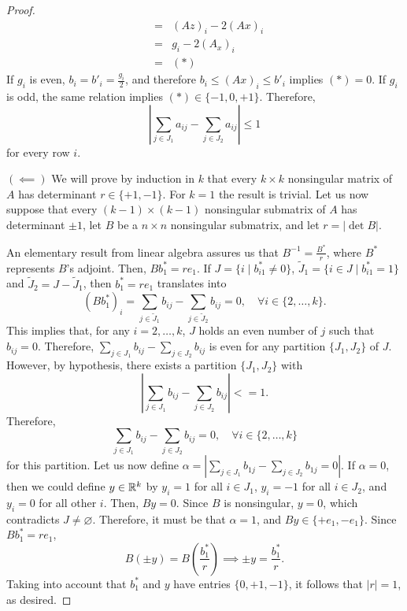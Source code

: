 \begin{proof}
\begin{eqnarray*}
            &=& (Az)_i - 2(Ax)_i\\
            &=& g_i - 2(A_x)_i\\
            &=& (*)
    \end{eqnarray*}
    If $g_i$ is even, $b_i = b'_i = \frac{g_i}{2}$, and therefore $b_i \leq
    (Ax)_i \leq b'_i$ implies $(*) = 0$. If $g_i$ is odd, the same relation
    implies $(*) \in \{-1, 0, +1\}$. Therefore,
    \begin{equation*}
        \left|
            \sum_{j \in J_1} a_{ij} - \sum_{j \in J_2} a_{ij}
        \right|
        \leq 1
    \end{equation*}
    for every row $i$.
    
    $(\impliedby)$
    We will prove by induction in $k$ that every $k \times k$ nonsingular matrix
    of $A$ has determinant $r \in \{+1, -1\}$. For $k = 1$ the result is
    trivial. Let us now suppose that every $(k-1)\times(k-1)$ nonsingular
    submatrix of $A$ has determinant $\pm 1$, let $B$ be a $n \times n$
    nonsingular submatrix, and let $r = |\det B|$.

    An elementary result from linear algebra assures us that $B^{-1} =
    \frac{B^*}{r}$, where $B^*$ represents $B$'s adjoint. Then, $B b^*_1 =
    re_1$. If $J = \{ i \mid b^*_{i1} \neq 0 \}$, $\tilde{J}_1 =\{i \in J \mid
    b^*_{i1} = 1 \}$ and $\tilde{J}_2 = J - \tilde{J}_1$, then $ b^*_1 = re_1$
    translates into
    \[
        (B b^*_1)_i
            = \sum_{j \in \tilde{J}_1} b_{ij} - \sum_{j \in \tilde{J}_2} b_{ij}
            = 0, \quad \forall i \in \{2, \ldots, k\}.
    \]
    This implies that, for any $i = 2, \ldots, k$, $J$ holds an even number of
    $j$ such that $b_{ij} = 0$. Therefore,
    $
        \sum_{j \in J_1} b_{ij} - \sum_{j \in J_2} b_{ij}
    $
    is even for any partition $\{J_1, J_2\}$ of $J$. However, by hypothesis,
    there exists a partition $\{J_1, J_2\}$ with
    \[
        |\sum_{j \in J_1} b_{ij} - \sum_{j \in J_2} b_{ij}| <= 1.
    \]
    Therefore,
    \[
        \sum_{j \in J_1} b_{ij} - \sum_{j \in J_2} b_{ij} = 0,
        \quad \forall i \in \{2, \ldots, k\}
    \]
    for this partition. Let us now define
    $
        \alpha = |\sum_{j \in J_1} b_{1j} - \sum_{j \in J_2} b_{1j} = 0|.
    $
    If $\alpha = 0$, then we could define $y \in {\ensuremath{\mathbb{R}}}^k$ by $y_i = 1$ for all $i
    \in J_1$, $y_i = -1$ for all $i \in J_2$, and $y_i = 0$ for all other $i$.
    Then, $By = 0$. Since $B$ is nonsingular, $y = 0$, which contradicts $J \neq
    \varnothing$. Therefore, it must be that $\alpha = 1$, and $By \in \{+e_1,
    -e_1\}$. Since $B b^*_1 = re_1$,
    \[
        B(\pm y) = B(\frac{b^*_1}{r}) \implies \pm y = \frac{b^*_1}{r}.
    \]
    Taking into account that $b^*_1$ and $y$ have entries $\{0, +1, -1\}$, it
    follows that $|r| = 1$, as desired.
\end{proof}

